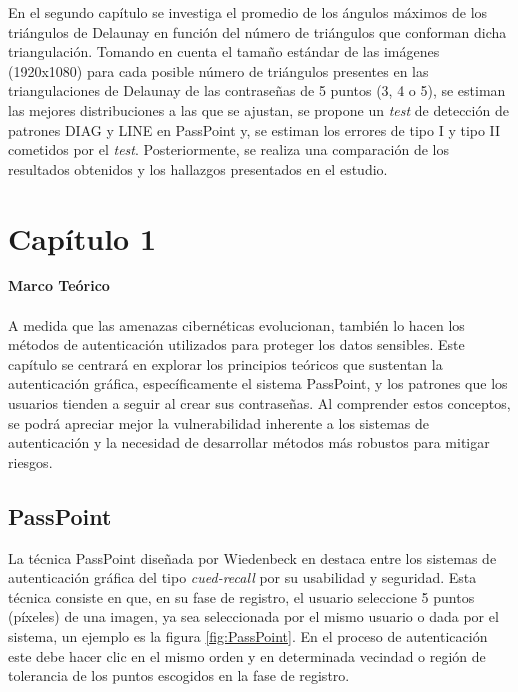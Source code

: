\documentclass[12pt]{report}
\begin{document}
	En el segundo capítulo se investiga el promedio de los ángulos máximos de los triángulos de Delaunay en función del número de triángulos que conforman dicha triangulación. Tomando en cuenta el tamaño estándar de las imágenes (1920x1080) para cada posible número de triángulos presentes en las triangulaciones de Delaunay de las contraseñas de 5 puntos (3, 4 o 5), se estiman las  mejores distribuciones a las que se ajustan, se propone un \textit{test} de detección de patrones DIAG y LINE en PassPoint y, se estiman los errores de tipo I y tipo II cometidos por el \textit{test}. Posteriormente, se realiza una comparación de los resultados obtenidos y los hallazgos presentados en el estudio\cite{13}.
	
	
	
	
	

\setcounter{chapter}{1}

\chapter*{\LARGE{Capítulo 1}}
\vspace{-2em} %
\noindent\textbf{\LARGE Marco Teórico}\\
\vspace{2em}
\\
 A medida que las amenazas cibernéticas evolucionan, también lo hacen los métodos de autenticación utilizados para proteger los datos sensibles. Este capítulo se centrará en explorar los principios teóricos que sustentan la autenticación gráfica, específicamente el sistema PassPoint, y los patrones que los usuarios tienden a seguir al crear sus contraseñas. Al comprender estos conceptos, se podrá apreciar mejor la vulnerabilidad inherente a los sistemas de autenticación y la necesidad de desarrollar métodos más robustos para mitigar riesgos.

\section{PassPoint}
	La técnica PassPoint diseñada por Wiedenbeck en \cite{1} destaca entre los sistemas de autenticación gráfica del tipo \textit{cued-recall} por su usabilidad y seguridad.
	Esta técnica consiste en que, en su fase de registro, el
	usuario seleccione 5 puntos (píxeles) de una imagen, ya sea seleccionada por el mismo usuario o dada por el sistema, un ejemplo es la figura \ref{fig:PassPoint}. En el proceso de autenticación este debe hacer clic en el mismo orden y en determinada  vecindad o región de tolerancia de los puntos escogidos en la fase de registro.
	
\end{document}

